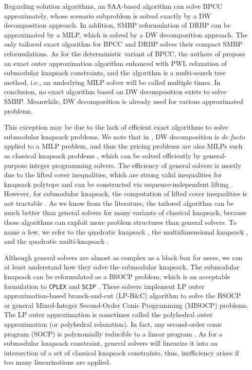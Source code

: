  
Regarding solution algorithms, an SAA-based   algorithm \cite{zhang2020branch} can solve BPCC approximately, whose scenario subproblem is solved exactly by a DW decomposition approach. In addition, SMBP reformulation of DRBP  \cite{zhang2020branch} can be approximated by a MILP, which is solved by a DW decomposition approach. The only tailored exact algorithm for BPCC and DRBP  \cite{zhang2018ambiguous} solves their compact SMBP reformulations. As for the deterministic variant of BPCC, the authors of   \cite{shylo2013} propose an exact outer approximation algorithm enhanced with PWL relaxation of submodular knapsack constraints, and the algorithm is a multi-search tree method, i.e., an underlying MILP solver will be called multiple times. In conclusion, no exact algorithm based on DW decomposition exists to solve SMBP. Meanwhile, DW decomposition is  already used for various approximated problems.


This exception  may be due to the lack of efficient exact algorithms to solve submodular knapsack problems.
We note that in \cite{zhang2020branch}, DW decomposition is \textit{de facto} applied to a MILP problem, and thus the  pricing problems are also MILPs such as classical knapsack problems \citep{cacchiani2022knapsack}, which can be solved efficiently by general-purpose integer programming solvers.  The efficiency of general solvers is mostly due to the lifted cover inequalities, which are strong valid inequalities for knapsack polytope and can be constructed via sequence-independent lifting \citep{gu1999lifted}. However, for submodular knapsack, the computation of lifted cover inequalities is not tractable  \citep{atamturk2009submodular}. As we know from the literature,  the tailored algorithm can be much better than general solvers for many variants of classical knapsack, because these algorithms can exploit more problem structures than general solvers. To name a few, we refer  to the quadratic knapsack \citep{caprara1999, furini2019theoretical}, the multidimensional knapsack \citep{Puchinger2010}, and the quadratic multi-knapsack \citep{Bergman19, olivir2021}.  

 
Although general solvers are almost as complex as a black box for users, we can at least understand how they solve the submodular knapsack. The submodular knapsack can be reformulated as a BSOCP problem, which is an acceptable formulation to  \texttt{CPLEX} \citep{bliek1u2014solving} and \texttt{SCIP} \citep{berthold2012extending}. These solvers implement  LP outer approximation-based branch-and-cut (LP-B$\&$C) algorithm \citep{coey2018outer} to solve the BSOCP or general Mixed-Integer Second-Order Conic Programming (MISOCP) problems. The LP outer approximation is sometimes called the polyhedral outer approximation (or polyhedral relaxation).  In fact, any second-order conic program (SOCP) is polynomially reducible to a linear program \cite{ben2001polyhedral}. As for a submodular knapsack constraint, general solvers will linearize it into an intersection of a set of classical knapsack constraints, thus, inefficiency arises if too many linearizations are applied.


